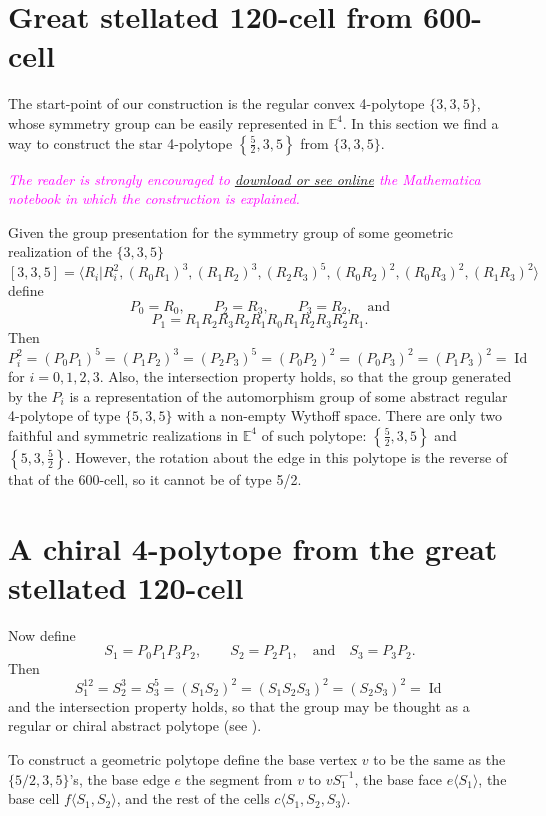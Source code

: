 \documentclass[spanish]{article}
\theoremstyle{definition}
\newcommand{\E}{\mathbb{E}}
\DeclareMathOperator{\Id}{Id}
\begin{document}
	\section{Great stellated 120-cell from 600-cell}
	The start-point of our construction is the regular convex 4-polytope $\{3,3,5\}$, whose symmetry group can be easily represented in $\E^4$.  In this section we find a way to construct the star 4-polytope $\left\{\frac{5}{2},3,5\right\}$ from $\{3,3,5\}$.
	
	\textcolor{magenta}{\textit{The reader is strongly encouraged to \href{https://www.wolframcloud.com/obj/dangcasanova/Published/chiral-4polytope.nb}{download or see online} the Mathematica notebook in which the construction is explained.}}
	
	Given the group presentation for the symmetry group of some geometric realization of the $\{3,3,5\}$
		\[[3,3,5]=\langle R_i|R_i^2,(R_0R_1)^3,(R_1R_2)^3,(R_2R_3)^5,(R_0R_2)^2,(R_0R_3)^2,(R_1R_3)^2\rangle\]
	define
		\[P_0=R_0,\qquad P_2=R_3,\qquad P_3=R_2,\quad\text{and}\]
		\[P_1=R_1R_2R_3R_2R_1R_0R_1R_2R_3R_2R_1.\]
	Then
		\[ P_i^2=(P_0P_1)^5=(P_1P_2)^3=(P_2P_3)^5=(P_0P_2)^2=(P_0P_3)^2=(P_1P_3)^2=\Id\]
	for $i=0,1,2,3$.
	Also, the intersection property holds, so that the group generated by the $P_i$ is a representation of the automorphism group of some abstract regular 4-polytope of type $\{5,3,5\}$ with a non-empty Wythoff space. There are only two faithful and symmetric realizations in $\mathbb{E}^4$ of such polytope: $\left\{\frac{5}{2},3,5\right\}$ and $\left\{5,3,\frac{5}{2}\right\}$. However, the rotation about the edge in this polytope is the reverse of that of the 600-cell, so it cannot be of type 5/2.
	

	\section{A chiral 4-polytope from the great stellated 120-cell}
	Now define
		\[S_1=P_0P_1P_3P_2,\qquad S_2=P_2P_1,\quad\text{and}\quad S_3=P_3P_2.\]
	Then
		\[S_1^{12}=S_2^3=S_3^5=(S_1S_2)^2=(S_1S_2S_3)^2=(S_2S_3)^2=\Id\]
	and the intersection property holds, so that the group may be thought as a regular or chiral abstract polytope (see \cite{schulte-chiral}).
	
	To construct a geometric polytope define the base vertex $v$ to be the same as the $\{5/2,3,5\}$'s, the base edge $e$ the segment from $v$ to $vS_1^{-1}$, the base face $e\langle S_1\rangle$, the base cell $f\langle S_1,S_2\rangle$, and the rest of the cells $c\langle S_1,S_2,S_3\rangle$.
	
\end{document}

